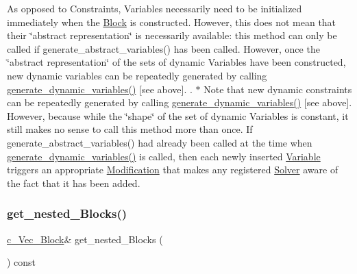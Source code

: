 As opposed to Constraints, Variables necessarily need to be initialized immediately when the \mbox{\hyperlink{class_s_m_spp__di__unipi__it_1_1_block}{Block}} is constructed. However, this does not mean that their \char`\"{}abstract representation\char`\"{} is necessarily available\+: this method can only be called if generate\+\_\+abstract\+\_\+variables() has been called. However, once the \char`\"{}abstract representation\char`\"{} of the sets of dynamic Variables have been constructed, new dynamic variables can be repeatedly generated by calling \mbox{\hyperlink{class_s_m_spp__di__unipi__it_1_1_block_ab90d0f60518eee75370e29c95bae4522}{generate\+\_\+dynamic\+\_\+variables()}} \mbox{[}see above\mbox{]}. . $\ast$ Note that new dynamic constraints can be repeatedly generated by calling \mbox{\hyperlink{class_s_m_spp__di__unipi__it_1_1_block_ab90d0f60518eee75370e29c95bae4522}{generate\+\_\+dynamic\+\_\+variables()}} \mbox{[}see above\mbox{]}. However, because while the \char`\"{}shape\char`\"{} of the set of dynamic Variables is constant, it still makes no sense to call this method more than once. If generate\+\_\+abstract\+\_\+variables() had already been called at the time when \mbox{\hyperlink{class_s_m_spp__di__unipi__it_1_1_block_ab90d0f60518eee75370e29c95bae4522}{generate\+\_\+dynamic\+\_\+variables()}} is called, then each newly inserted \mbox{\hyperlink{class_s_m_spp__di__unipi__it_1_1_variable}{Variable}} triggers an appropriate \mbox{\hyperlink{class_s_m_spp__di__unipi__it_1_1_modification}{Modification}} that makes any registered \mbox{\hyperlink{class_s_m_spp__di__unipi__it_1_1_solver}{Solver}} aware of the fact that it has been added. \mbox{\label{class_s_m_spp__di__unipi__it_1_1_block_a39bc932e28075740f08b392830a67e03}} 
\subsubsection{\texorpdfstring{get\+\_\+nested\+\_\+\+Blocks()}{get\_nested\_Blocks()}}
{\footnotesize\ttfamily \mbox{\hyperlink{group___block___t_y_p_e_s_ga7cbe2d2777d0b63cf75c041bf7e60dff}{c\+\_\+\+Vec\+\_\+\+Block}}\& get\+\_\+nested\+\_\+\+Blocks (\begin{DoxyParamCaption}\item[{void}]{ }\end{DoxyParamCaption}) const\hspace{0.3cm}{\ttfamily [inline]}}



